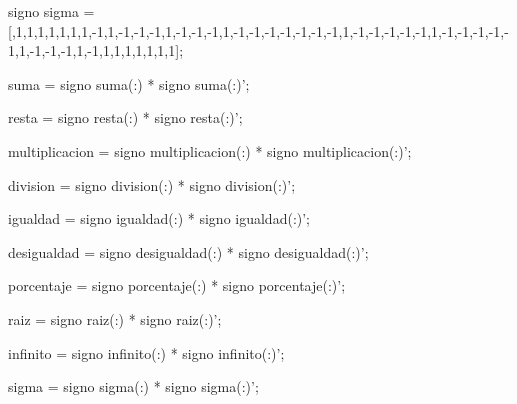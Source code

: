 \documentclass[letterpaper,12pt]{article}
\begin{document}
\begin{tcolorbox}
signo sigma = 
[,1,1,1,1,1,1,1,-1,1,-1,-1,-1,1,-1,-1,-1,1,-1,-1,-1,-1,-1,-1,-1,1,-1,-1,-1,-1,-1,1,-1,-1,-1,-1,-1,1,-1,-1,-1,1,-1,1,1,1,1,1,1,1];

suma = signo suma(:) * signo suma(:)';

resta = signo resta(:) * signo resta(:)';

multiplicacion = signo multiplicacion(:) * signo multiplicacion(:)';

division = signo division(:) * signo division(:)';

igualdad = signo igualdad(:) * signo igualdad(:)';

desigualdad = signo desigualdad(:) * signo desigualdad(:)';

porcentaje = signo porcentaje(:) * signo porcentaje(:)';

raiz = signo raiz(:) * signo raiz(:)';

infinito = signo infinito(:) * signo infinito(:)';

sigma = signo sigma(:) * signo sigma(:)';

\end{tcolorbox}
\newpage
\end{document}
